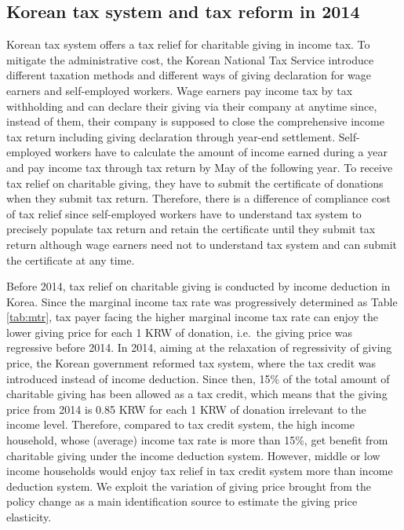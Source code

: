 \documentclass[
  11pt,
  a4paper,
]{article}
\begin{document}
\hypertarget{taxreform}{%
\subsection{Korean tax system and tax reform in 2014}\label{taxreform}}

Korean tax system offers a tax relief for charitable giving in income tax.
To mitigate the administrative cost,
the Korean National Tax Service introduce different taxation methods
and different ways of giving declaration for wage earners and self-employed workers.
Wage earners pay income tax by tax withholding and
can declare their giving via their company at anytime
since, instead of them, their company is supposed to
close the comprehensive income tax return including giving declaration
through year-end settlement.
Self-employed workers have to calculate the amount of income
earned during a year and pay income tax through tax return by May of the following year.
To receive tax relief on charitable giving,
they have to submit the certificate of donations when they submit tax return.
Therefore, there is a difference of compliance cost of tax relief
since self-employed workers have to understand tax system to precisely populate tax return
and retain the certificate until they submit tax return
although wage earners need not to understand tax system and
can submit the certificate at any time.

Before 2014, tax relief on charitable giving is conducted by income deduction in Korea.
Since the marginal income tax rate was progressively determined as Table \ref{tab:mtr},
tax payer facing the higher marginal income tax rate
can enjoy the lower giving price for each 1 KRW of donation,
i.e.~the giving price was regressive before 2014.
In 2014, aiming at the relaxation of regressivity of giving price,
the Korean government reformed tax system,
where the tax credit was introduced instead of income deduction.
Since then, 15\% of the total amount of charitable giving has been allowed as a tax credit,
which means that the giving price from 2014 is 0.85 KRW
for each 1 KRW of donation irrelevant to the income level.
Therefore, compared to tax credit system,
the high income household,
whose (average) income tax rate is more than 15\%,
get benefit from charitable giving under the income deduction system.
However, middle or low income households would enjoy tax relief in tax credit system
more than income deduction system.
We exploit the variation of giving price brought from the policy change
as a main identification source to estimate the giving price elasticity.
\end{document}
